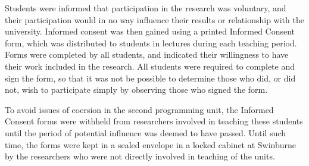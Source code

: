 Students were informed that participation in the research was voluntary, and their participation would in no way influence their results or relationship with the university. Informed consent was then gained using a printed Informed Consent form, which was distributed to students in lectures during each teaching period. Forms were completed by all students, and indicated their willingness to have their work included in the research. All students were required to complete and sign the form, so that it was not be possible to determine those who did, or did not, wish to participate simply by observing those who signed the form.

To avoid issues of coersion in the second programming unit, the Informed Consent forms were withheld from researchers involved in teaching these students until the period of potential influence was deemed to have passed. Until such time, the forms were kept in a sealed envelope in a locked cabinet at Swinburne by the researchers who were not directly involved in teaching of the units.

